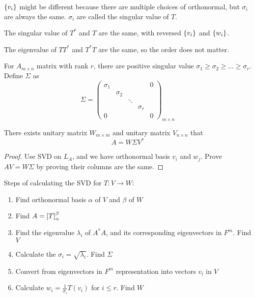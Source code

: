 \begin{definition}
    $\set{v_i}$ might be different because there are multiple choices of orthonormal, but $\sigma_i$ are always the same. $\sigma_i$ are called the singular value of $T$.
\end{definition}


The singular value of $T^*$ and $T$ are the same, with reversed $\set{v_i}$ and $\set{w_i}$.


The eigenvalue of $TT^*$ and $T^*T$ are the same, so the order does not matter.

\begin{theorem}
    For $A_{m \times n}$ matrix with rank $r$, there are positive singular value $\sigma_1 \geq \sigma_2 \geq ... \geq \sigma_r$. Define $\Sigma$ as
    \begin{equation}
        \Sigma = \begin{pmatrix}
            \sigma_1 & & & & 0 \\
             & \sigma_2 \\
             &  & \ddots &  \\
             &  &  &\sigma_r \\
            0 & & &  & 0
        \end{pmatrix}_{m \times n}
    \end{equation}
    
    There exists unitary matrix $W_{m \times m}$ and unitary matrix $V_{n \times n}$ that
    \begin{equation}
        A = W \Sigma V^*
    \end{equation}
\end{theorem}
\begin{proof}
    Use SVD on $L_A$, and we have orthonormal basis $v_i$ and $w_j$. Prove $AV = W \Sigma$ by proving their columns are the same.
\end{proof}

Steps of calculating the SVD for $T:V \rightarrow W$:
\begin{enumerate}
    \item Find orthonormal basis $\alpha$ of $V$ and $\beta$ of $W$
    \item Find $A = \coordinate{T}_\alpha^\beta$
    \item Find the eigenvalue $\lambda_i$ of $A^*A$, and its corresponding eigenvectors in $F^m$. Find $V$
    \item Calculate the $\sigma_i = \sqrt{\lambda_i}$. Find $\Sigma$
    \item Convert from eigenvectors in $F^m$ representation into vectors $v_i$ in $V$
    \item Calculate $\displaystyle w_i = \frac{1}{\sigma_i} T(v_i)$ for $i \leq r$. Find $W$
\end{enumerate}

